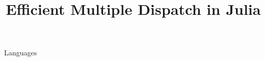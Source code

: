 \documentclass[9pt,cm,preprint]{sigplanconf}
\begin{document}


\title{Efficient Multiple Dispatch in Julia}

\authorinfo{}{}{}

\maketitle




\terms Languages


\newcommand{\code}[1]{\texttt{#1}}
\newcommand{\package}[1]{\code{#1}\cite{#1}}
















\end{document}
